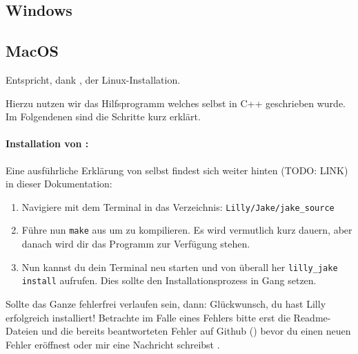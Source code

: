 \subsection{Windows }
\subsection{MacOS}
\begin{center}
    Entspricht, dank \Jake, der Linux-Installation.
\end{center}
Hierzu nutzen wir das Hilfsprogramm \Jake welches selbst in C++ geschrieben wurde. 
Im Folgendenen sind die Schritte kurz erklärt. 
\paragraph{Installation von \Jake:}Eine ausführliche Erklärung von \Jake selbst findest sich weiter hinten (TODO: LINK) in dieser Dokumentation:\smallskip
{}
\begin{enumerate}\setlength{\itemsep}{0.25\baselineskip}
    \item Navigiere mit dem Terminal in das Verzeichnis: \verb|Lilly/Jake/jake_source|
    \item Führe nun \verb|make| aus um \Jake zu kompilieren. 
          Es wird vermutlich kurz dauern, aber danach wird dir das Programm \LJake zur Verfügung stehen.
    \item Nun kannst du dein Terminal neu starten und von überall her \verb|lilly_jake install| aufrufen.
          Dies sollte den Installationsprozess in Gang setzen.\smallskip
\end{enumerate}
Sollte das Ganze fehlerfrei verlaufen sein, dann: Glückwunsch, du hast Lilly erfolgreich installiert!
Betrachte im Falle eines Fehlers bitte erst die Readme-Dateien und die bereits beantworteten Fehler
auf Github (\href{https://github.com/EagleoutIce/LILLY/issues}{\faGithub}) bevor du einen neuen Fehler
eröffnest oder mir eine Nachricht schreibst \Smiley.
